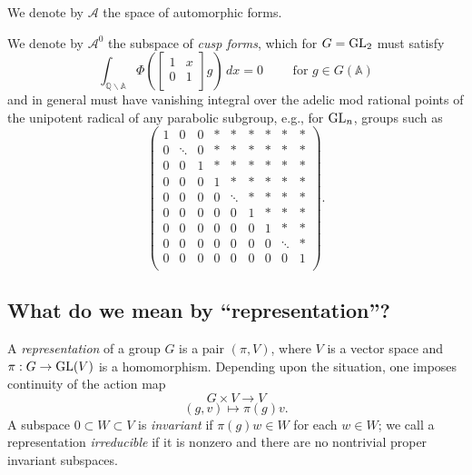 \documentclass[reqno]{amsart} 
\begin{document}
We denote by $\mathcal{A}$ the space of automorphic forms.

We denote by $\mathcal{A}^0$ the subspace of \emph{cusp forms}, which for $G = \operatorname{GL}_2$ must satisfy
\begin{equation*}
  \int_{\mathbb{Q} \backslash \mathbb{A}} \Phi \left(
    \begin{bmatrix}
      1      & x \\
      0 & 1 \\
    \end{bmatrix}
    g
  \right) \, d x = 0
  \qquad \text{ for } g \in G(\mathbb{A})
\end{equation*}
and in general must have vanishing integral over the adelic mod rational points of the unipotent radical of any parabolic subgroup, e.g., for $\operatorname{GL}_n$, groups such as
\begin{equation*}
  \left(
    \begin{array}{ccc|ccc|ccc}
      1 & 0 & 0 & \ast & \ast & \ast & \ast & \ast & \ast \\
      0 & \ddots & 0 & \ast & \ast & \ast & \ast & \ast & \ast \\
      0 & 0 & 1 & \ast & \ast & \ast & \ast & \ast & \ast \\
      \hline
      0 & 0 & 0 & 1 & \ast & \ast & \ast & \ast & \ast \\
      0 & 0 & 0 & 0 & \ddots & \ast & \ast & \ast & \ast \\
      0 & 0 & 0 & 0 & 0 & 1 & \ast & \ast & \ast \\
      \hline
      0 & 0 & 0 & 0 & 0 & 0 & 1 & \ast & \ast \\
      0 & 0 & 0 & 0 & 0 & 0 & 0 & \ddots & \ast \\
      0 & 0 & 0 & 0 & 0 & 0 & 0 & 0 & 1 \\
    \end{array}
  \right).
\end{equation*}

\subsection{What do we mean by ``representation''?}

A \emph{representation} of a group $G$ is a pair $(\pi, V)$, where $V$ is a vector space and $\pi : G \rightarrow \operatorname{GL}(V)$ is a homomorphism.  Depending upon the situation, one imposes continuity of the action map
\begin{equation*}
  G \times V \rightarrow V
\end{equation*}
\begin{equation*}
  (g, v) \mapsto \pi(g) v.
\end{equation*}
A subspace $0 \subset W \subset V$ is \emph{invariant} if $\pi(g) w \in W$ for each $w \in W$; we call a representation \emph{irreducible} if it is nonzero and there are no nontrivial proper invariant subspaces.
\end{document}
